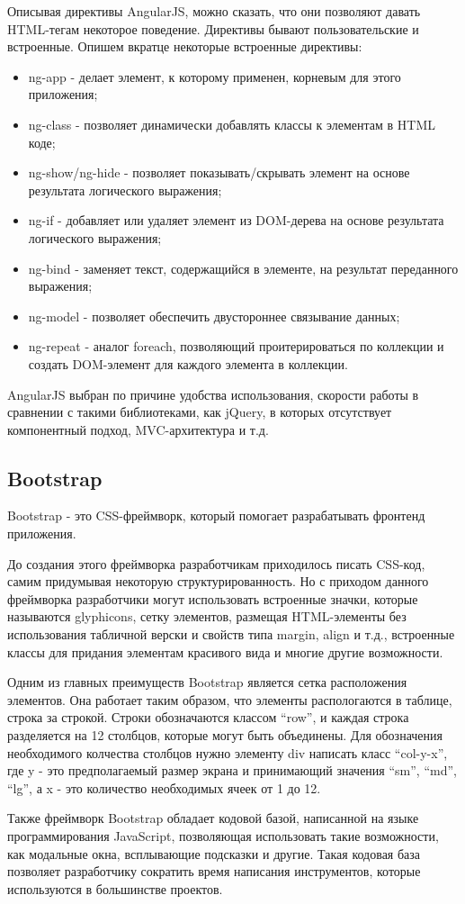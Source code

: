 Описывая директивы AngularJS, можно сказать, что они позволяют давать HTML-тегам некоторое поведение. Директивы бывают пользовательские и встроенные. Опишем вкратце некоторые встроенные директивы:

\begin{itemize}
  \item ng-app - делает элемент, к которому применен, корневым для этого приложения;
  \item ng-class - позволяет динамически добавлять классы к элементам в HTML коде;
  \item ng-show/ng-hide - позволяет показывать/скрывать элемент на основе результата логического выражения;
  \item ng-if - добавляет или удаляет элемент из DOM-дерева на основе результата логического выражения;
  \item ng-bind - заменяет текст, содержащийся в элементе, на результат переданного выражения;
  \item ng-model - позволяет обеспечить двустороннее связывание данных;
  \item ng-repeat - аналог foreach, позволяющий проитерироваться по коллекции и создать DOM-элемент для каждого элемента в коллекции.
\end{itemize}

AngularJS выбран по причине удобства использования, скорости работы в сравнении с такими библиотеками, как jQuery, в которых отсутствует компонентный подход, MVC-архитектура и т.д.

\subsection{Bootstrap}
\label{sub:technologies:bootstrap}
Bootstrap - это CSS-фреймворк, который помогает разрабатывать фронтенд приложения.

До создания этого фреймворка разработчикам приходилось писать CSS-код, самим придумывая некоторую структурированность. Но с приходом данного фреймворка разработчики могут использовать встроенные значки, которые называются glyphicons, сетку элементов, размещая HTML-элементы без использования табличной верски и свойств типа margin, align и т.д., встроенные классы для придания элементам красивого вида и многие другие возможности.

Одним из главных преимуществ Bootstrap является сетка расположения элементов. Она работает таким образом, что элементы распологаются в таблице, строка за строкой. Строки обозначаются классом ``row'', и каждая строка разделяется на 12 столбцов, которые могут быть объединены. Для обозначения необходимого колчества столбцов нужно элементу div написать класс ``col-y-x'', где y - это предполагаемый размер экрана и принимающий значения ``sm'', ``md'', ``lg'', а x - это количество необходимых ячеек от 1 до 12.

Также фреймворк Bootstrap обладает кодовой базой, написанной на языке программирования JavaScript, позволяющая использовать такие возможности, как модальные окна, всплывающие подсказки и другие. Такая кодовая база позволяет разработчику сократить время написания инструментов, которые используются в большинстве проектов.
